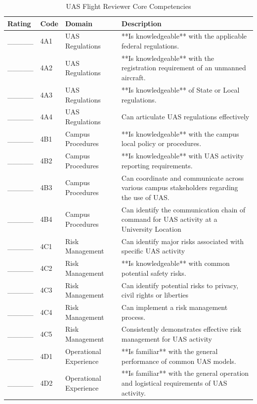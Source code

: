 \documentclass[
]{book}
\begin{document}
\begin{longtable}[t]{lll>{\raggedright\arraybackslash}p{25em}}
\caption{\label{tab:unnamed-chunk-14}UAS Flight Reviewer Core Competencies}\\
\toprule
Rating & Code & Domain & Description\\
\midrule
\_\_\_\_\_ & 4A1 & UAS Regulations & **Is knowledgeable** with the applicable federal regulations.\\
\_\_\_\_\_ & 4A2 & UAS Regulations & **Is knowledgeable** with the registration requirement of an unmanned aircraft.\\
\_\_\_\_\_ & 4A3 & UAS Regulations & **Is knowledgeable** of State or Local regulations.\\
\_\_\_\_\_ & 4A4 & UAS Regulations & Can articulate UAS regulations effectively\\
\_\_\_\_\_ & 4B1 & Campus Procedures & **Is knowledgeable** with the campus local policy or procedures.\\
\addlinespace
\_\_\_\_\_ & 4B2 & Campus Procedures & **Is knowledgeable** with UAS activity reporting requirements.\\
\_\_\_\_\_ & 4B3 & Campus Procedures & Can coordinate and communicate across various campus stakeholders regarding the use of UAS.\\
\_\_\_\_\_ & 4B4 & Campus Procedures & Can identify the communication chain of command for UAS activity at a University Location\\
\_\_\_\_\_ & 4C1 & Risk Management & Can identify major risks associated with specific UAS activity\\
\_\_\_\_\_ & 4C2 & Risk Management & **Is knowledgeable** with common potential safety risks.\\
\addlinespace
\_\_\_\_\_ & 4C3 & Risk Management & Can identify potential risks to privacy, civil rights or liberties\\
\_\_\_\_\_ & 4C4 & Risk Management & Can implement a risk management process.\\
\_\_\_\_\_ & 4C5 & Risk Management & Consistently demonstrates effective risk management for UAS activity\\
\_\_\_\_\_ & 4D1 & Operational Experience & **Is familiar** with the general performance of common UAS models.\\
\_\_\_\_\_ & 4D2 & Operational Experience & **Is familiar** with the general operation and logistical requirements of UAS activity.\\
\bottomrule
\end{longtable}
\end{document}
